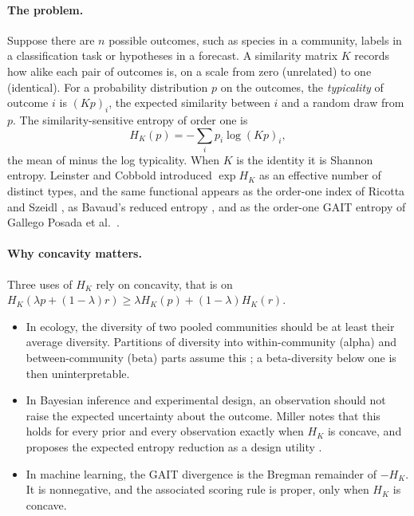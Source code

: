 \documentclass[11pt,a4paper]{article}
\theoremstyle{remark}
\begin{document}
\paragraph{The problem.} Suppose there are $n$ possible outcomes, such as species in a community, labels in a classification task or hypotheses in a forecast. A similarity matrix $K$ records how alike each pair of outcomes is, on a scale from zero (unrelated) to one (identical). For a probability distribution $p$ on the outcomes, the \emph{typicality} of outcome $i$ is $(Kp)_i$, the expected similarity between $i$ and a random draw from $p$. The similarity-sensitive entropy of order one is
\[
 H_K(p)=-\sum_i p_i\log (Kp)_i ,
\]
the mean of minus the log typicality. When $K$ is the identity it is Shannon entropy. Leinster and Cobbold \cite{lc} introduced $\exp H_K$ as an effective number of distinct types, and the same functional appears as the order-one index of Ricotta and Szeidl \cite{rs}, as Bavaud's reduced entropy \cite{bavaud}, and as the order-one GAIT entropy of Gallego Posada et al.\ \cite{gait}.

\paragraph{Why concavity matters.} Three uses of $H_K$ rely on concavity, that is on $H_K(\lambda p+(1-\lambda)r)\ge\lambda H_K(p)+(1-\lambda)H_K(r)$.
\begin{itemize}
\item In ecology, the diversity of two pooled communities should be at least their average diversity. Partitions of diversity into within-community (alpha) and between-community (beta) parts assume this \cite{botta,reeve}; a beta-diversity below one is then uninterpretable.
\item In Bayesian inference and experimental design, an observation should not raise the expected uncertainty about the outcome. Miller \cite[Section 4.1]{miller} notes that this holds for every prior and every observation exactly when $H_K$ is concave, and proposes the expected entropy reduction as a design utility \cite[Section 6.2]{miller}.
\item In machine learning, the GAIT divergence \cite[Definition 2]{gait} is the Bregman remainder of $-H_K$. It is nonnegative, and the associated scoring rule is proper, only when $H_K$ is concave.
\end{itemize}
\end{document}
